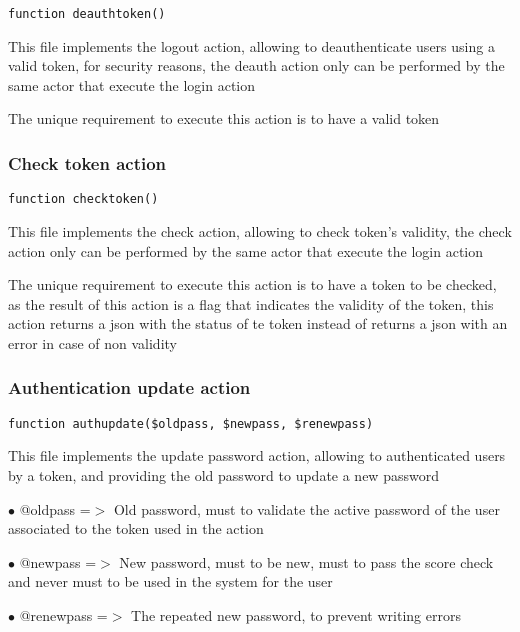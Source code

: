\documentclass[a4paper]{article}
\begin{document}
\begin{lstlisting}
function deauthtoken()
\end{lstlisting}

This file implements the logout action, allowing to deauthenticate users
using a valid token, for security reasons, the deauth action only can
be performed by the same actor that execute the login action

The unique requirement to execute this action is to have a valid token

\hypertarget{toc377}{}
\subsubsection{Check token action}

\begin{lstlisting}
function checktoken()
\end{lstlisting}

This file implements the check action, allowing to check token's validity, the check
action only can be performed by the same actor that execute the login action

The unique requirement to execute this action is to have a token to be checked, as the
result of this action is a flag that indicates the validity of the token, this action
returns a json with the status of te token instead of returns a json with an error in
case of non validity

\hypertarget{toc378}{}
\subsubsection{Authentication update action}

\begin{lstlisting}
function authupdate($oldpass, $newpass, $renewpass)
\end{lstlisting}

This file implements the update password action, allowing to authenticated
users by a token, and providing the old password to update a new password

\begin{compactitem}
\item[\color{myblue}$\bullet$] @oldpass   =$>$ Old password, must to validate the active password of the user
              associated to the token used in the action
\item[\color{myblue}$\bullet$] @newpass   =$>$ New password, must to be new, must to pass the score check and
              never must to be used in the system for the user
\item[\color{myblue}$\bullet$] @renewpass =$>$ The repeated new password, to prevent writing errors
\end{compactitem}
\end{document}
